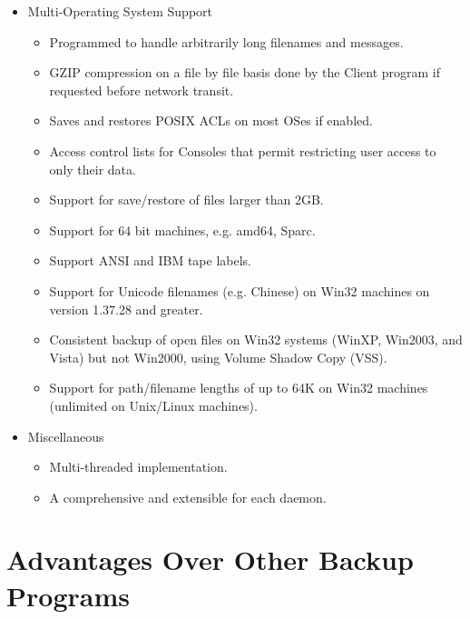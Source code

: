 \begin{itemize}
\item Multi-Operating System Support
   \begin{itemize} 
   \item Programmed to handle arbitrarily long filenames and messages.  
   \item GZIP compression on a file by file basis done by the Client program  if
      requested before network transit.  
   \item Saves and restores POSIX ACLs on most OSes if enabled.  
   \item Access control lists for Consoles that permit restricting user access
      to only their data.  
   \item Support for save/restore of files larger than 2GB.  
   \item Support for 64 bit machines, e.g. amd64, Sparc.
   \item Support ANSI and IBM tape labels.
   \item Support for Unicode filenames (e.g. Chinese) on Win32 machines on
         version 1.37.28 and greater.
   \item Consistent backup of open files on Win32 systems (WinXP, Win2003, 
         and Vista)
         but not Win2000, using Volume Shadow Copy (VSS).
   \item Support for path/filename lengths of up to 64K on Win32 machines
         (unlimited on Unix/Linux machines).
   \end{itemize}

\item Miscellaneous
   \begin{itemize}
   \item Multi-threaded implementation.  
   \item A comprehensive and extensible 
       for each daemon.  
   \end{itemize}
\end{itemize}

\section{Advantages Over Other Backup Programs}

